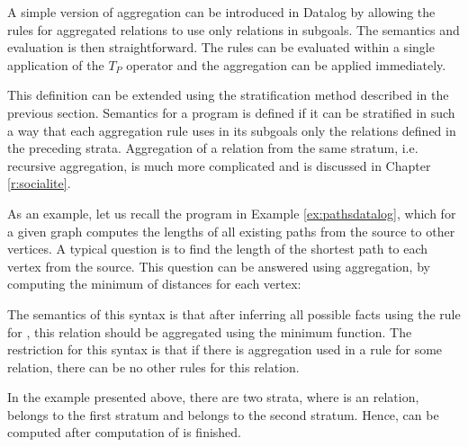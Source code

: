 A simple version of aggregation can be introduced in Datalog by allowing the rules for aggregated relations to use only \edb relations in subgoals. The semantics and evaluation is then straightforward. The rules can be evaluated within a single application of the $T_P$ operator and the aggregation can be applied immediately.

This definition can be extended using the stratification method described in the previous section. Semantics for a program is defined if it can be stratified in such a way that each aggregation rule uses in its subgoals only the relations defined in the preceding strata. Aggregation of a relation from the same stratum, i.e. recursive aggregation, is much more complicated and is discussed in Chapter \ref{r:socialite}.

As an example, let us recall the program in Example \ref{ex:pathsdatalog}, which for a given graph computes the lengths of all existing paths from the source to other vertices. A typical question is to find the length of the shortest  path to each vertex from the source. This question can be answered using aggregation, by computing the minimum of distances for each vertex: 


The semantics of this syntax is that after inferring all possible facts using the rule for , this relation should be aggregated using the minimum function. The restriction for this syntax is that if there is aggregation used in a rule for some relation, there can be no other rules for this relation.

In the example presented above, there are two strata, where  is an \edb relation,  belongs to the first stratum and  belongs to the second stratum. Hence,  can be computed after computation of  is finished.


